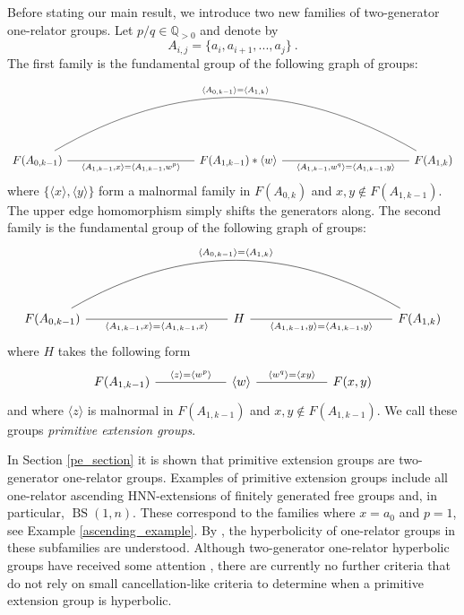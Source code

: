 \documentclass[11pt, a4paper]{amsart}
\theoremstyle{definition}
\newcommand{\Q}{\mathbb{Q}}
\DeclareMathOperator{\bs}{BS}
\begin{document}
Before stating our main result, we introduce two new families of two-generator one-relator groups. Let $p/q\in \Q_{>0}$ and denote by
\[
A_{i, j} = \{a_i, a_{i+1}, ..., a_j\}~. 
\]
The first family is the fundamental group of the following graph of groups:
\[
\begin{tikzcd}[sep=2cm]
{F(A_{0, k-1})} \arrow[rr, "{\langle A_{1, k-1}, x\rangle = \langle A_{1, k-1}, w^p\rangle}"', no head] &  & {F(A_{1, k-1})*\langle w\rangle} \arrow[rr, "{\langle A_{1, k-1}, w^q\rangle = \langle A_{1, k-1}, y\rangle}"', no head] &  & {F(A_{1, k})} \arrow[llll, "{\langle A_{0,k-1}\rangle = \langle A_{1, k}\rangle}"', no head, bend right]
\end{tikzcd}
\]
where $\{\langle x\rangle, \langle y\rangle\}$ form a malnormal family in $F(A_{0, k})$ and $x, y\notin F(A_{1, k-1})$. The upper edge homomorphism simply shifts the generators along. The second family is the fundamental group of the following graph of groups:
\[
\begin{tikzcd}[sep=2cm]
{F(A_{0, k-1})} \arrow[rr, "{\langle A_{1, k-1}, x\rangle = \langle A_{1, k-1}, x\rangle}"', no head] &  & H \arrow[rr, "{\langle A_{1, k-1}, y\rangle = \langle A_{1, k-1}, y\rangle}"', no head] &  & {F(A_{1, k})} \arrow[llll, "{\langle A_{0,k-1}\rangle = \langle A_{1, k}\rangle}"', no head, bend right]
\end{tikzcd}
\]
where $H$ takes the following form
\[
\begin{tikzcd}[sep=2cm]
{F(A_{1, k-1})} \arrow[r, "\langle z\rangle = \langle w^p\rangle", no head] & \langle w\rangle \arrow[r, "\langle w^q\rangle = \langle xy\rangle", no head] & {F(x, y)}
\end{tikzcd}
\]
and where $\langle z\rangle$ is malnormal in $F(A_{1, k-1})$ and $x, y\notin F(A_{1, k-1})$. We call these groups \emph{primitive extension groups}. 

In Section \ref{pe_section} it is shown that primitive extension groups are two-generator one-relator groups. Examples of primitive extension groups include all one-relator ascending HNN-extensions of finitely generated free groups and, in particular, $\bs(1, n)$. These correspond to the families where $x = a_0$ and $p = 1$, see Example \ref{ascending_example}. By \cite{mutanguha_21}, the hyperbolicity of one-relator groups in these subfamilies are understood. Although two-generator one-relator hyperbolic groups have received some attention \cite{kapovich_99_two, gardam_21_jsj}, there are currently no further criteria that do not rely on small cancellation-like criteria to determine when a primitive extension group is hyperbolic.
\end{document}
